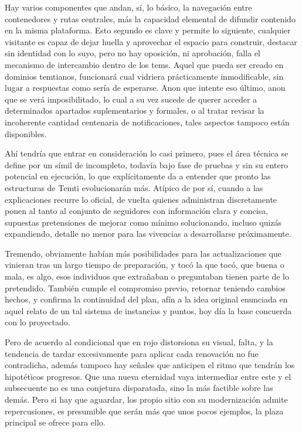 \documentclass[
]{book}
\begin{document}
Hay varios componentes que andan, sí, lo básico, la navegación entre contenedores y rutas centrales, más la capacidad elemental de difundir contenido en la misma plataforma. Esto segundo es clave y permite lo siguiente, cualquier visitante es capaz de dejar huella y aprovechar el espacio para construir, destacar sin identidad con lo suyo, pero no hay oposición, ni aprobación, falla el mecanismo de intercambio dentro de los tems. Aquel que pueda ser creado en dominios temtianos, funcionará cual vidriera prácticamente inmodificable, sin lugar a respuestas como sería de esperarse. Anon que intente eso último, anon que se verá imposibilitado, lo cual a su vez sucede de querer acceder a determinados apartados suplementarios y formales, o al tratar revisar la incoherente cantidad centenaria de notificaciones, tales aspectos tampoco están disponibles.

Ahí tendría que entrar en consideración lo casi primero, pues el área técnica se define por un símil de incompleto, todavía bajo fase de pruebas y sin su entero potencial en ejecución, lo que explícitamente da a entender que pronto las estructuras de Temti evolucionarán más. Atípico de por sí, cuando a las explicaciones recurre lo oficial, de vuelta quienes administran discretamente ponen al tanto al conjunto de seguidores con información clara y concisa, supuestas pretensiones de mejorar como mínimo solucionando, incluso quizás expandiendo, detalle no menor para las vivencias a desarrollarse próximamente.

Tremendo, obviamente habían más posibilidades para las actualizaciones que vinieran tras un largo tiempo de preparación, y tocó la que tocó, que buena o mala, es algo, esos individuos que extrañaban o preguntaban tienen parte de lo pretendido. También cumple el compromiso previo, retornar teniendo cambios hechos, y confirma la continuidad del plan, afín a la idea original enunciada en aquel relato de un tal sistema de instancias y puntos, hoy día la base concuerda con lo proyectado.

Pero de acuerdo al condicional que en rojo distorsiona su visual, falta, y la tendencia de tardar excesivamente para aplicar cada renovación no fue contradicha, además tampoco hay señales que anticipen el ritmo que tendrán los hipotéticos progresos. Que una nueva eternidad vaya intermediar entre este y el subsecuente no es una conjetura disparatada, sino la más factible sobre las demás. Pero si hay que aguardar, los propio sitio con su modernización admite repercusiones, es presumible que serán más que unos pocos ejemplos, la plaza principal se ofrece para ello.
\end{document}
